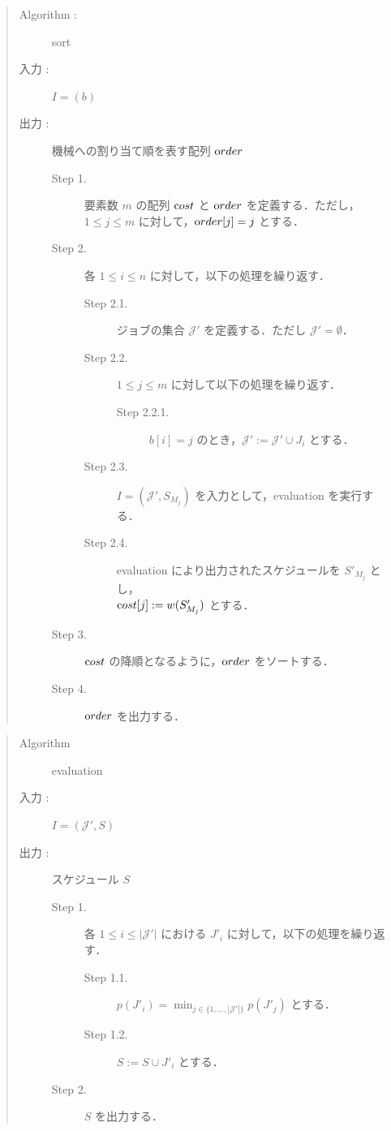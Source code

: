 \documentclass[12pt]{optlab-bachelor}
\begin{document}
\begin{quote}
  \begin{description}
    \item[{\sc Algorithm : }] {\sc sort}
    \item[入力 :] $I = (b)$
    \item[出力 :] 機械への割り当て順を表す配列 ${\mbox order}$
    \begin{description}
      \item[Step 1.] 要素数 $m$ の配列 ${\mbox cost}$ と ${\mbox order}$ を定義する．ただし，$1 \le j \le m $ に対して，${\mbox order}[j] = j$ とする．
      \item[Step 2.] 各 $1 \le i \le n$ に対して，以下の処理を繰り返す．
      \begin{description}
        \item[Step 2.1.] ジョブの集合 $\mathcal{J}'$ を定義する．ただし $\mathcal{J}' = \emptyset$．
        \item[Step 2.2.] $1 \le j \le m$ に対して以下の処理を繰り返す．
        \begin{description}
          \item[Step 2.2.1.] $b[i] = j$ のとき，$\mathcal{J}' :=\mathcal{J}' \cup J_i$ とする．
        \end{description}
        \item[Step 2.3.] $I = (\mathcal{J}',S_{M_j})$ を入力として，{\sc evaluation} を実行する．
        \item[Step 2.4.] {\sc evaluation} により出力されたスケジュールを $S'_{M_j}$ とし，\\${\mbox cost}[j] := w(S'_{M_j})$ とする．
      \end{description}
      \item[Step 3.] ${\mbox cost}$ の降順となるように，${\mbox order}$ をソートする．
      \item[Step 4.] ${\mbox order}$ を出力する．
    \end{description}
  \end{description}
\end{quote}

\begin{quote}
  \begin{description}
    \item[{\sc Algorithm}] {\sc evaluation}
    \item[入力 :] $I = (\mathcal{J'},S)$
    \item[出力 :] スケジュール $S$
    \begin{description}
      \item[Step 1.] 各 $1 \le i \le |\mathcal{J}'|$ における $J'_i$ に対して，以下の処理を繰り返す．
      \begin{description}
        \item[Step 1.1.] $p(J'_i) = \displaystyle \min_{j \in \{1,\ldots,|\mathcal{J}'|\}}p(J'_j)$ とする．
        \item[Step 1.2.] $S := S \cup J'_i$ とする．
      \end{description}
      \item[Step 2.] $S$ を出力する．
    \end{description}
  \end{description}
\end{quote}
\end{document}
